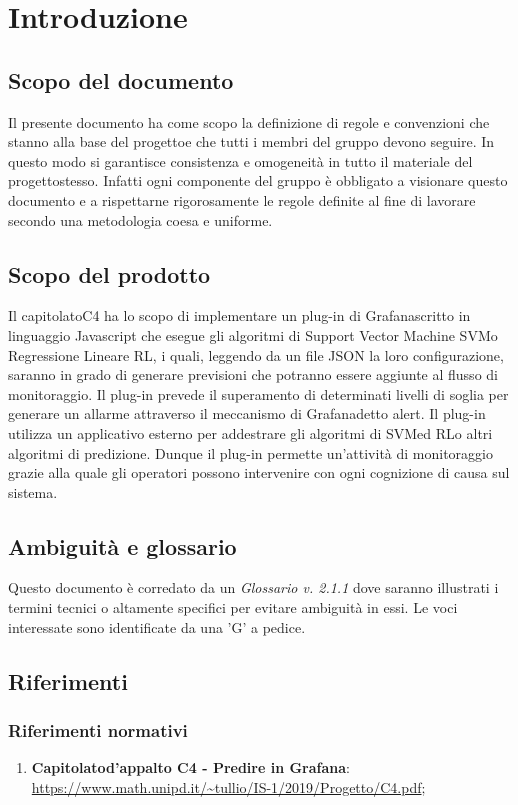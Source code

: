 \section{Introduzione}
\subsection{Scopo del documento}
Il presente documento ha come scopo la definizione di regole e convenzioni che stanno alla base del progetto\glosp e che tutti i membri del gruppo devono seguire. In questo modo si garantisce consistenza e omogeneità in tutto il materiale del progetto\glosp stesso. Infatti ogni componente del gruppo è obbligato a visionare questo documento e a rispettarne rigorosamente le regole definite al fine di lavorare secondo una metodologia coesa e uniforme.
\subsection{Scopo del prodotto}
Il capitolato\glosp C4 ha lo scopo di implementare un plug-in di Grafana\glosp scritto in linguaggio Javascript che esegue gli algoritmi di Support Vector Machine SVM\glosp o Regressione Lineare RL\glo, i quali, leggendo da un file JSON la loro configurazione, saranno in grado di generare previsioni che potranno essere aggiunte al flusso di monitoraggio. Il plug-in prevede il superamento di determinati livelli di soglia per generare un allarme attraverso il meccanismo di Grafana\glosp detto alert\glo. Il plug-in utilizza un applicativo esterno per addestrare gli algoritmi di SVM\glosp ed RL\glosp o altri algoritmi di predizione.
Dunque il plug-in permette un'attività di monitoraggio grazie alla quale gli operatori possono intervenire con ogni cognizione di causa sul sistema.
\subsection{Ambiguità e glossario}
Questo documento è corredato da un \textit{Glossario v. 2.1.1} dove saranno illustrati i termini tecnici o altamente specifici per evitare ambiguità in essi. Le voci interessate sono identificate da una 'G' a pedice.
\subsection{Riferimenti}
\subsubsection{Riferimenti normativi}
\begin{enumerate}
	\item \textbf{Capitolato}\glosp \textbf{d'appalto C4 - Predire in Grafana}\glo: \url{https://www.math.unipd.it/~tullio/IS-1/2019/Progetto/C4.pdf};
\end{enumerate}
